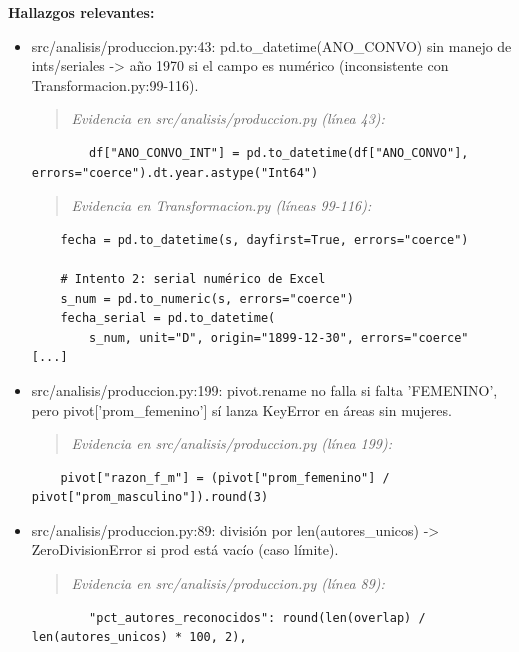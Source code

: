 \textbf{Hallazgos relevantes:}
\begin{itemize}
  \item src/analisis/produccion.py:43: pd.to\_datetime(ANO\_CONVO) sin manejo de ints/seriales -> año 1970 si el campo es numérico (inconsistente con Transformacion.py:99-116).
\begin{quote}\footnotesize\ttfamily
\noindent\emph{Evidencia en src/analisis/produccion.py (línea 43):}
\end{quote}
\begin{lstlisting}
        df["ANO_CONVO_INT"] = pd.to_datetime(df["ANO_CONVO"], errors="coerce").dt.year.astype("Int64")
\end{lstlisting}

\begin{quote}\footnotesize\ttfamily
\noindent\emph{Evidencia en Transformacion.py (líneas 99-116):}
\end{quote}
\begin{lstlisting}
    fecha = pd.to_datetime(s, dayfirst=True, errors="coerce")

    # Intento 2: serial numérico de Excel
    s_num = pd.to_numeric(s, errors="coerce")
    fecha_serial = pd.to_datetime(
        s_num, unit="D", origin="1899-12-30", errors="coerce"
[...]
\end{lstlisting}

  \item src/analisis/produccion.py:199: pivot.rename no falla si falta 'FEMENINO', pero pivot['prom\_femenino'] sí lanza KeyError en áreas sin mujeres.
\begin{quote}\footnotesize\ttfamily
\noindent\emph{Evidencia en src/analisis/produccion.py (línea 199):}
\end{quote}
\begin{lstlisting}
    pivot["razon_f_m"] = (pivot["prom_femenino"] / pivot["prom_masculino"]).round(3)
\end{lstlisting}

  \item src/analisis/produccion.py:89: división por len(autores\_unicos) -> ZeroDivisionError si prod está vacío (caso límite).
\begin{quote}\footnotesize\ttfamily
\noindent\emph{Evidencia en src/analisis/produccion.py (línea 89):}
\end{quote}
\begin{lstlisting}
        "pct_autores_reconocidos": round(len(overlap) / len(autores_unicos) * 100, 2),
\end{lstlisting}


\end{itemize}
